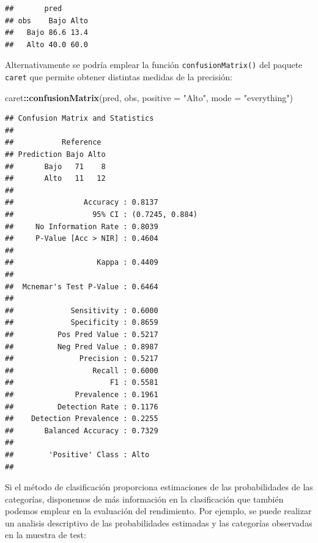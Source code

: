 \documentclass[
]{book}
\newenvironment{Shaded}{\begin{snugshade}}{\end{snugshade}}
\newcommand{\DataTypeTok}[1]{\textcolor[rgb]{0.13,0.29,0.53}{#1}}
\newcommand{\KeywordTok}[1]{\textcolor[rgb]{0.13,0.29,0.53}{\textbf{#1}}}
\newcommand{\NormalTok}[1]{#1}
\newcommand{\OperatorTok}[1]{\textcolor[rgb]{0.81,0.36,0.00}{\textbf{#1}}}
\newcommand{\StringTok}[1]{\textcolor[rgb]{0.31,0.60,0.02}{#1}}
\theoremstyle{break}
\theoremstyle{definition}
\theoremstyle{definition}
\theoremstyle{definition}
\theoremstyle{remark}
\begin{document}
\begin{verbatim}
##       pred
## obs    Bajo Alto
##   Bajo 86.6 13.4
##   Alto 40.0 60.0
\end{verbatim}

Alternativamente se podría emplear la función \texttt{confusionMatrix()} del paquete \texttt{caret} que permite obtener distintas medidas de la precisión:

\begin{Shaded}
\begin{Highlighting}[]
\NormalTok{caret}\OperatorTok{::}\KeywordTok{confusionMatrix}\NormalTok{(pred, obs, }\DataTypeTok{positive =} \StringTok{"Alto"}\NormalTok{, }\DataTypeTok{mode =} \StringTok{"everything"}\NormalTok{)}
\end{Highlighting}
\end{Shaded}

\begin{verbatim}
## Confusion Matrix and Statistics
## 
##           Reference
## Prediction Bajo Alto
##       Bajo   71    8
##       Alto   11   12
##                                          
##                Accuracy : 0.8137         
##                  95% CI : (0.7245, 0.884)
##     No Information Rate : 0.8039         
##     P-Value [Acc > NIR] : 0.4604         
##                                          
##                   Kappa : 0.4409         
##                                          
##  Mcnemar's Test P-Value : 0.6464         
##                                          
##             Sensitivity : 0.6000         
##             Specificity : 0.8659         
##          Pos Pred Value : 0.5217         
##          Neg Pred Value : 0.8987         
##               Precision : 0.5217         
##                  Recall : 0.6000         
##                      F1 : 0.5581         
##              Prevalence : 0.1961         
##          Detection Rate : 0.1176         
##    Detection Prevalence : 0.2255         
##       Balanced Accuracy : 0.7329         
##                                          
##        'Positive' Class : Alto           
## 
\end{verbatim}

Si el método de clasificación proporciona estimaciones de las probabilidades de las categorías, disponemos de más información en la clasificación que también podemos emplear en la evaluación del rendimiento.
Por ejemplo, se puede realizar un analisis descriptivo de las probabilidades estimadas y las categorías observadas en la muestra de test:
\end{document}
